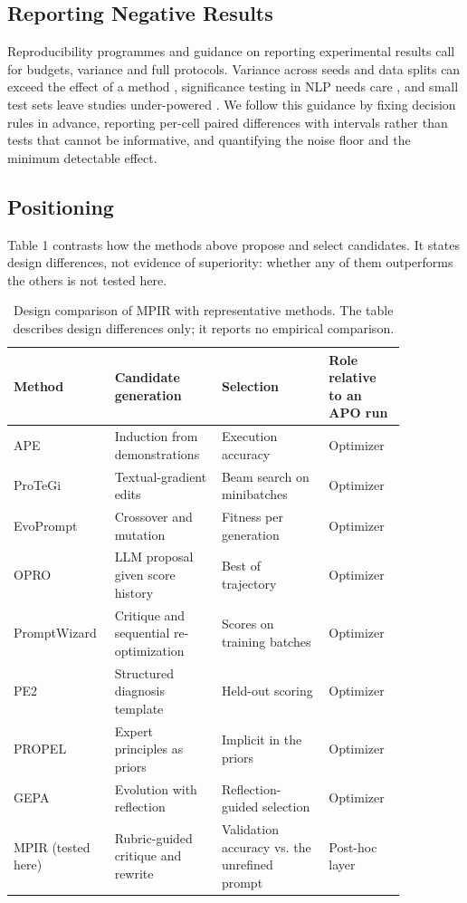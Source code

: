 \documentclass{ieeeaccess}
\begin{document}
\subsection{Reporting Negative Results}

Reproducibility programmes \cite{pineau2021} and guidance on reporting experimental results \cite{dodge2019} call for budgets, variance and full protocols. Variance across seeds and data splits can exceed the effect of a method \cite{bouthillier2021}, significance testing in NLP needs care \cite{dror2018}, and small test sets leave studies under-powered \cite{card2020}. We follow this guidance by fixing decision rules in advance, reporting per-cell paired differences with intervals rather than tests that cannot be informative, and quantifying the noise floor and the minimum detectable effect.

\subsection{Positioning}

Table 1 contrasts how the methods above propose and select candidates. It states design differences, not evidence of superiority: whether any of them outperforms the others is not tested here.

\begin{table}[htbp]
\centering
\small
\caption{Design comparison of MPIR with representative methods. The table describes design differences only; it reports no empirical comparison.}
\begin{tabular}{>{\raggedright\arraybackslash}p{0.155\linewidth}>{\raggedright\arraybackslash}p{0.258\linewidth}>{\raggedright\arraybackslash}p{0.258\linewidth}>{\raggedright\arraybackslash}p{0.189\linewidth}}
\toprule
\textbf{Method} & \textbf{Candidate generation} & \textbf{Selection} & \textbf{Role relative to an APO run} \\
\midrule
APE \cite{zhou2023} & Induction from demonstrations & Execution accuracy & Optimizer \\
ProTeGi \cite{pryzant2023} & Textual-gradient edits & Beam search on minibatches & Optimizer \\
EvoPrompt \cite{guo2024} & Crossover and mutation & Fitness per generation & Optimizer \\
OPRO \cite{yang2024} & LLM proposal given score history & Best of trajectory & Optimizer \\
PromptWizard \cite{agarwal2025} & Critique and sequential re-optimization & Scores on training batches & Optimizer \\
PE2 \cite{ye2024} & Structured diagnosis template & Held-out scoring & Optimizer \\
PROPEL \cite{mayilvaghanan2025} & Expert principles as priors & Implicit in the priors & Optimizer \\
GEPA \cite{agrawal2026} & Evolution with reflection & Reflection-guided selection & Optimizer \\
MPIR (tested here) & Rubric-guided critique and rewrite & Validation accuracy vs. the unrefined prompt & Post-hoc layer \\
\bottomrule
\end{tabular}
\end{table}
\end{document}
